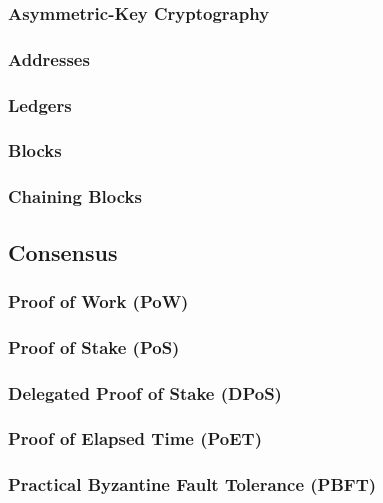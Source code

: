 \subsubsection{Asymmetric-Key Cryptography}

\subsubsection{Addresses}

\subsubsection{Ledgers}

\subsubsection{Blocks}

\subsubsection{Chaining Blocks}

\subsection{Consensus}

\subsubsection{Proof of Work (PoW)}

\subsubsection{Proof of Stake (PoS)}

\subsubsection{Delegated Proof of Stake (DPoS)}

\subsubsection{Proof of Elapsed Time (PoET)}

\subsubsection{Practical Byzantine Fault Tolerance (PBFT)}

